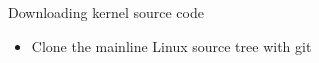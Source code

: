 \setuplabframe
{Downloading kernel source code}
{
  \begin{itemize}
  \item Clone the mainline Linux source tree with git
  \end{itemize}
}
